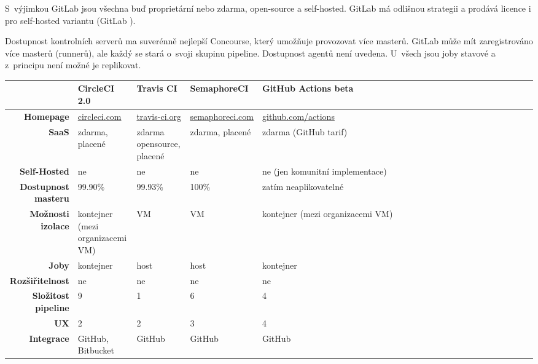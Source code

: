     S~výjimkou GitLab jsou všechna \CI buď proprietární  nebo zdarma, open-source a self-hosted. GitLab má odlišnou strategii a prodává licence i pro self-hosted variantu (GitLab ).

    Dostupnost kontrolních serverů ma suverénně nejlepší Concourse, který umožňuje provozovat více masterů. GitLab může mít zaregistrováno více masterů (runnerů), ale každý se stará o~svoji skupinu pipeline. Dostupnost agentů není uvedena. U~všech \CI jsou joby stavové a z~principu není možné je replikovat.

    \newpage
    \vspace*{-0.3cm}
    \begin{adjustwidth}{-2cm}{}
        \begin{tabular}{|r||p{3.2cm}|p{2.7cm}|p{2.9cm}|p{3.2cm}|}\hline
            & \textbf{CircleCI 2.0} & \textbf{Travis CI} & \textbf{SemaphoreCI} & \textbf{GitHub Actions beta} \\\hline\hline
            \textbf{Homepage} & \url{circleci.com} & \url{travis-ci.org} & \url{semaphoreci.com} & \url{github.com/actions} \\\hline
            \textbf{SaaS} & zdarma, placené & zdarma opensource, placené & zdarma, placené & zdarma (GitHub tarif) \\\hline
            \textbf{Self-Hosted} & ne & ne & ne & ne (jen komunitní implementace) \\\hline
            \textbf{Dostupnost masteru} & 99.90\% & 99.93\% & 100\% & zatím neaplikovatelné \\\hline
            \textbf{Možnosti izolace} & kontejner (mezi organizacemi VM) & VM & VM & kontejner (mezi organizacemi VM) \\\hline
            \textbf{Joby} & kontejner & host & host & kontejner\ \ \ \ \ \ \ \ \ \ \ \ \ \ \ \ \ \ \ \ \ \ \ \ \ \ \ \ \ \  \\\hline
            \textbf{Rozšiřitelnost} & ne & ne & ne & ne\ \ \ \ \ \ \ \ \ \ \ \ \ \ \ \ \ \ \ \ \ \ \ \ \ \ \ \ \ \ \ \ \ \ \ \ \ \ \ \ \ \ \ \ \ \ \ \ \ \ \ \ \ \ \ \ \ \ \ \ \\\hline
            \textbf{Složitost pipeline} & 9 & 1 & 6 & 4 \\\hline
            \textbf{UX} & 2 & 2 & 3 & 4 \\\hline
            \textbf{Integrace} & GitHub, Bitbucket & GitHub & GitHub & GitHub \\\hline
        \end{tabular}
    \end{adjustwidth}
    \vspace*{0.3cm}

